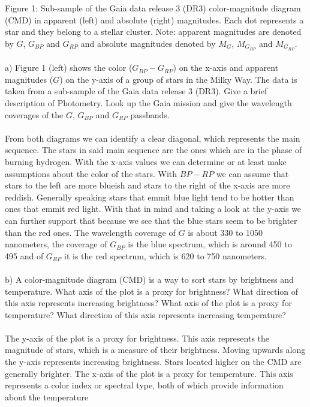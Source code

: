 Figure 1: Sub-sample of the Gaia data release 3 (DR3) color-magnitude diagram (CMD) in apparent  (left)
and absolute (right) magnitudes. Each dot represents a star and they belong to a stellar cluster. Note:
apparent magnitudes are denoted by $G$, $G_{BP}$ and $G_{RP}$ and absolute magnitudes denoted by $M_G$, 
$M_{G_{BP}}$ and $M_{G_{RP}}$.\\
\\
a) Figure 1 (left) shows the color ($G_{BP} - G_{RP}$) on the x-axis and apparent magnitudes ($G$) on the
y-axis of a group of stars in the Milky Way. The data is taken from a sub-sample of the Gaia data release
3 (DR3). Give a brief description of Photometry. Look up the Gaia mission and give the wavelength 
coverages of the $G$, $G_{BP}$ and $G_{RP}$ passbands.\\
\\
From both diagrams we can identify a clear diagonal, which represents the main sequence. The 
stars in said main sequence are the ones which are in the phase of burning hydrogen. With the x-axis 
values we can determine or at least make assumptions about the color of the stars. With $BP - RP$ we can 
assume that stars to the left are more blueish and stars to the right of the x-axis are more reddish.
Generally speaking stars that emmit blue light tend to be hotter than ones that emmit red light. With that
in mind and taking a look at the y-axis we can further support that because we see that the blue stars 
seem to be brighter than the red ones. The wavelength coverage of $G$ is about 330 to 1050 nanometers, the 
coverage of $G_{BP}$ is the blue spectrum, which is around 450 to 495 and of $G_{RP}$ it is the red 
spectrum, which is 620 to 750 nanometers.\\
\\
b) A color-magnitude diagram (CMD) is a way to sort stars by brightness and temperature. What axis of the
plot is a proxy for brightness? What direction of this axis represents increasing brightness? What axis
of the plot is a proxy for temperature? What direction of this axis represents increasing temperature?\\
\\
The y-axis of the plot is a proxy for brightness. This axis represents the magnitude of stars, which is 
a measure of their brightness. Moving upwards along the y-axis represents increasing brightness. Stars 
located higher on the CMD are generally brighter. The x-axis of the plot is a proxy for temperature. This 
axis represents a color index or spectral type, both of which provide information about the temperature 
